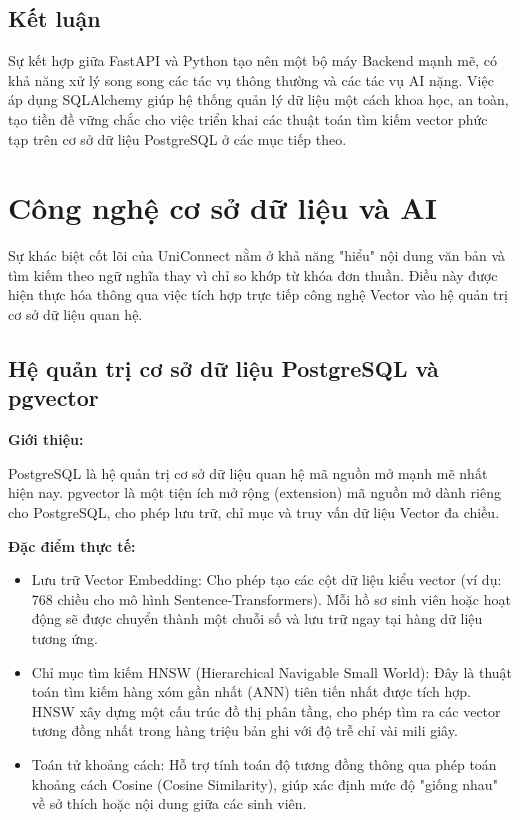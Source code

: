 \subsection{Kết luận} 

Sự kết hợp giữa FastAPI và Python tạo nên một bộ máy Backend mạnh mẽ, có khả năng xử lý song song các tác vụ thông thường và các tác vụ AI nặng. Việc áp dụng SQLAlchemy giúp hệ thống quản lý dữ liệu một cách khoa học, an toàn, tạo tiền đề vững chắc cho việc triển khai các thuật toán tìm kiếm vector phức tạp trên cơ sở dữ liệu PostgreSQL ở các mục tiếp theo.

\section{Công nghệ cơ sở dữ liệu và AI}

Sự khác biệt cốt lõi của UniConnect nằm ở khả năng "hiểu" nội dung văn bản và tìm kiếm theo ngữ nghĩa thay vì chỉ so khớp từ khóa đơn thuần. Điều này được hiện thực hóa thông qua việc tích hợp trực tiếp công nghệ Vector vào hệ quản trị cơ sở dữ liệu quan hệ.

\subsection{Hệ quản trị cơ sở dữ liệu PostgreSQL và pgvector}

\textbf{Giới thiệu:}

PostgreSQL là hệ quản trị cơ sở dữ liệu quan hệ mã nguồn mở mạnh mẽ nhất hiện nay. pgvector là một tiện ích mở rộng (extension) mã nguồn mở dành riêng cho PostgreSQL, cho phép lưu trữ, chỉ mục và truy vấn dữ liệu Vector đa chiều\cite{koplyay2022postgresql}.

\textbf{Đặc điểm thực tế:}

\begin{itemize}
    \item Lưu trữ Vector Embedding: Cho phép tạo các cột dữ liệu kiểu vector (ví dụ: 768 chiều cho mô hình Sentence-Transformers). Mỗi hồ sơ sinh viên hoặc hoạt động sẽ được chuyển thành một chuỗi số và lưu trữ ngay tại hàng dữ liệu tương ứng.

    \item Chỉ mục tìm kiếm HNSW (Hierarchical Navigable Small World): Đây là thuật toán tìm kiếm hàng xóm gần nhất (ANN) tiên tiến nhất được tích hợp. HNSW xây dựng một cấu trúc đồ thị phân tầng, cho phép tìm ra các vector tương đồng nhất trong hàng triệu bản ghi với độ trễ chỉ vài mili giây.
    
    \item Toán tử khoảng cách: Hỗ trợ tính toán độ tương đồng thông qua phép toán khoảng cách Cosine (Cosine Similarity), giúp xác định mức độ "giống nhau" về sở thích hoặc nội dung giữa các sinh viên.
\end{itemize}

